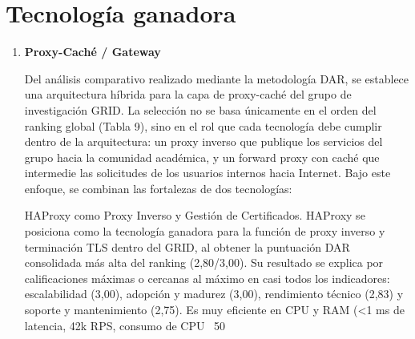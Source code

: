 \section{Tecnología ganadora}\label{sec:ganadora}

\begin{enumerate}[label=\textbf{\arabic*.}, leftmargin=*, itemsep=0.9em]
  \item \textbf{Proxy-Caché / Gateway}

  Del análisis comparativo realizado mediante la metodología DAR, se establece una arquitectura híbrida para la capa de proxy-caché del grupo de investigación GRID. La selección no se basa únicamente en el orden del ranking global (Tabla 9), sino en el rol que cada tecnología debe cumplir dentro de la arquitectura: un proxy inverso que publique los servicios del grupo hacia la comunidad académica, y un forward proxy con caché que intermedie las solicitudes de los usuarios internos hacia Internet. Bajo este enfoque, se combinan las fortalezas de dos tecnologías:

  HAProxy como Proxy Inverso y Gestión de Certificados. HAProxy se posiciona como la tecnología ganadora para la función de proxy inverso y terminación TLS dentro del GRID, al obtener la puntuación DAR consolidada más alta del ranking (2,80/3,00). Su resultado se explica por calificaciones máximas o cercanas al máximo en casi todos los indicadores: escalabilidad (3,00), adopción y madurez (3,00), rendimiento técnico (2,83) y soporte y mantenimiento (2,75). Es muy eficiente en CPU y RAM (<1 ms de latencia, 42k RPS, consumo de CPU ~50 %


\end{enumerate}
